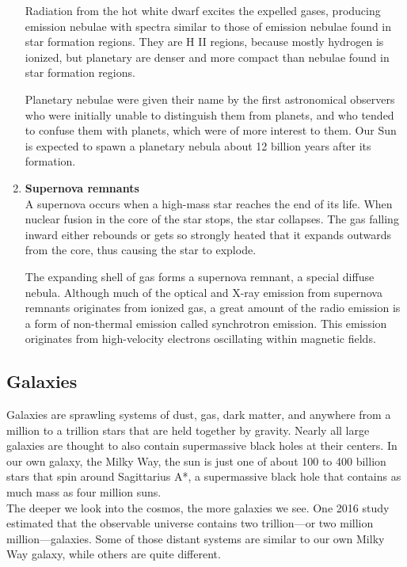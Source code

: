 \documentclass{article}
\begin{document}
\begin{enumerate}
    Radiation from the hot white dwarf excites the expelled gases, producing emission nebulae with spectra similar to those of emission nebulae found in star formation regions. They are H II regions, because mostly hydrogen is ionized, but planetary are denser and more compact than nebulae found in star formation regions.
    
    Planetary nebulae were given their name by the first astronomical observers who were initially unable to distinguish them from planets, and who tended to confuse them with planets, which were of more interest to them. Our Sun is expected to spawn a planetary nebula about 12 billion years after its formation.
    
    \item \textbf{Supernova remnants}\\
    A supernova occurs when a high-mass star reaches the end of its life. When nuclear fusion in the core of the star stops, the star collapses. The gas falling inward either rebounds or gets so strongly heated that it expands outwards from the core, thus causing the star to explode.
    
    The expanding shell of gas forms a supernova remnant, a special diffuse nebula. Although much of the optical and X-ray emission from supernova remnants originates from ionized gas, a great amount of the radio emission is a form of non-thermal emission called synchrotron emission. This emission originates from high-velocity electrons oscillating within magnetic fields.
\end{enumerate}
\subsection{Galaxies}
Galaxies are sprawling systems of dust, gas, dark matter, and anywhere from a million to a trillion stars that are held together by gravity. Nearly all large galaxies are thought to also contain supermassive black holes at their centers. In our own galaxy, the Milky Way, the sun is just one of about 100 to 400 billion stars that spin around Sagittarius A*, a supermassive black hole that contains as much mass as four million suns.
\\
The deeper we look into the cosmos, the more galaxies we see. One 2016 study estimated that the observable universe contains two trillion—or two million million—galaxies. Some of those distant systems are similar to our own Milky Way galaxy, while others are quite different.
\end{document}
